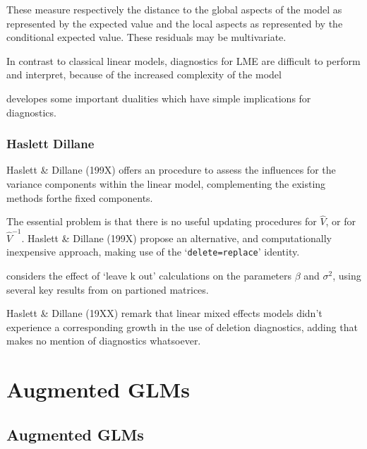\documentclass[Main.tex]{subfiles}
\begin{document}
These measure respectively the distance to the global aspects of the model as represented by the expected value and the local aspects as represented by the conditional expected value.
These residuals may be multivariate.
	
In contrast to classical linear models, diagnostics for LME are	difficult to perform and interpret, because of the increased complexity of the model

\citet{HaslettHayes} developes some important dualities which have simple implications for diagnostics.


	
\subsection*{Haslett Dillane}
Haslett \& Dillane (199X) offers an	procedure to assess the influences for the variance components within the linear model, complementing the existing methods forthe fixed components. 
	
The essential problem is that there is no useful updating procedures for $\hat{V}$, or for $\hat{V}^{-1}$. Haslett \& Dillane (199X) propose an alternative, and computationally inexpensive approach, making use of the `\texttt{delete=replace}' identity.
	
\citet{Haslett99} considers the effect of `leave k out' calculations on the parameters $\beta$ and $\sigma^{2}$, using several key results from \citet{HaslettHayes} on partioned matrices.
	
Haslett \& Dillane (19XX) remark that linear mixed effects models didn't experience a corresponding growth in the use of deletion diagnostics, adding that \citet{McCullSearle} makes no mention of diagnostics whatsoever.


\chapter{Augmented GLMs} 




\section{Augmented GLMs} %
\end{document}
